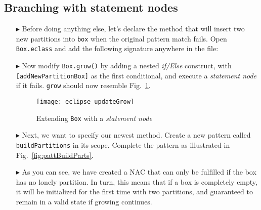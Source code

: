 \newpage
\hypertarget{conBran tex}{}
\subsection{Branching with statement nodes}
\texHeader

\begin{itemize}

\item[$\blacktriangleright$] Before doing anything else, let's declare the method that will insert two new partitions into \texttt{box} when the original
pattern match fails. Open \texttt{Box.eclass} and add the following signature anywhere in the file: 

\vspace{0.5cm}

\item[$\blacktriangleright$] Now modify \texttt{Box.grow()} by adding a nested \emph{if/Else} construct, with \texttt{[addNewPartitionBox]} as the
first conditional, and execute a \emph{statement node} if it fails. \texttt{grow} should now resemble Fig.~\ref{fig:updateGrow}.

\vspace{0.5cm}

\begin{figure}[htp]
\begin{center}
  \texttt{[image: eclipse\_updateGrow]}
  \caption{Extending \texttt{Box} with a \emph{statement node}}
  \label{fig:updateGrow}
\end{center}
\end{figure}

\vspace{0.5cm}

\item[$\blacktriangleright$] Next, we want to specify our newest method. Create a new pattern called \texttt{buildPartitions} in its scope. Complete
the pattern as illustrated in Fig.~\ref{fig:pattBuildParts}.

\item[$\blacktriangleright$] As you can see, we have created a NAC that can only be fulfilled if the box has no lonely partition. In turn, this means that if a
box is completely empty, it will be initialized for the first time with two partitions, and guaranteed to remain in a valid state if growing continues.

\clearpage

\vspace*{2cm}


\end{itemize}
